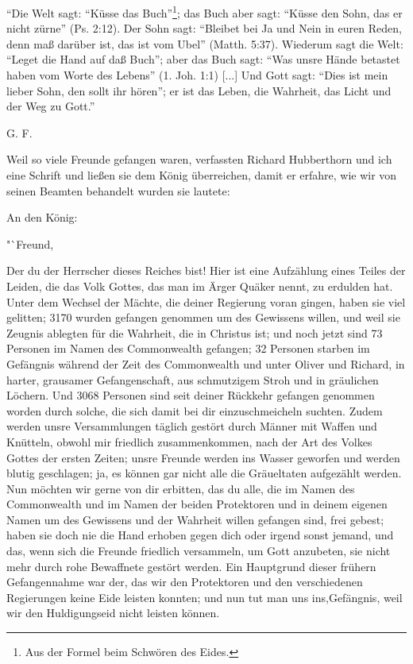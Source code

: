 "`Die Welt sagt: "`Küsse das Buch"'\footnote{Aus der Formel beim 
Schwören des Eides.}; das Buch aber sagt:
"`Küsse den Sohn, das er nicht zürne"' (Ps. 2:12). 
Der Sohn sagt: "`Bleibet bei Ja und Nein in euren Reden, denn maß darüber ist,
das ist vom Ubel"' (Matth. 5:37). Wiederum 
sagt die Welt: "`Leget die Hand auf daß Buch"'; aber das Buch sagt: "`Was unsre Hände
betastet haben vom Worte des Lebens"' (1. Joh. 1:1) [...] Und
Gott sagt: "`Dies ist mein lieber Sohn, den sollt ihr hören"';
er ist das Leben, die Wahrheit, das Licht und der Weg zu Gott."'
\begin{flushright}G. F.\end{flushright}

Weil so viele Freunde gefangen waren, verfassten Richard
Hubberthorn und ich eine Schrift 
und ließen sie dem König überreichen,
damit er erfahre, wie wir von seinen Beamten behandelt wurden
sie lautete:

\begin{center}
An den König:\end{center}
"`Freund,

Der du der Herrscher dieses Reiches bist! Hier ist eine Aufzählung 
eines Teiles der Leiden, die das Volk Gottes, das man
im Ärger Quäker nennt, zu erdulden hat. Unter dem Wechsel
der Mächte, die deiner Regierung voran gingen, haben sie viel
gelitten; 3170 wurden gefangen genommen um des Gewissens
willen, und weil sie Zeugnis ablegten für die Wahrheit, die in
Christus ist; und noch jetzt sind 73 Personen im Namen des 
Commonwealth gefangen; 32 Personen starben im Gefängnis während
der Zeit des Commonwealth und unter Oliver und Richard, in
harter, grausamer Gefangenschaft, aus schmutzigem Stroh und in
gräulichen Löchern. Und 3068 Personen sind seit deiner Rückkehr
gefangen genommen worden durch solche, die sich damit bei dir
einzuschmeicheln suchten. Zudem werden unsre Versammlungen
täglich gestört durch Männer mit Waffen und Knütteln, obwohl
mir friedlich zusammenkommen, nach der Art des Volkes Gottes
der ersten Zeiten; unsre Freunde werden ins Wasser geworfen
und werden blutig geschlagen; ja, es können gar nicht alle die
Gräueltaten aufgezählt werden. Nun möchten wir gerne von dir
erbitten, das du alle, die im Namen des Commonwealth und im
Namen der beiden Protektoren und in deinem eigenen Namen
um des Gewissens und der Wahrheit willen gefangen sind, frei
gebest; haben sie doch nie die Hand erhoben gegen dich oder
irgend sonst jemand, und das, wenn sich die Freunde friedlich
versammeln, um Gott anzubeten, sie nicht mehr durch rohe 
Bewaffnete gestört werden. Ein Hauptgrund dieser frühern 
Gefangennahme war der, das wir den Protektoren und den verschiedenen
Regierungen keine Eide leisten konnten; und nun tut man uns
ins,Gefängnis, weil wir den Huldigungseid nicht leisten können.


